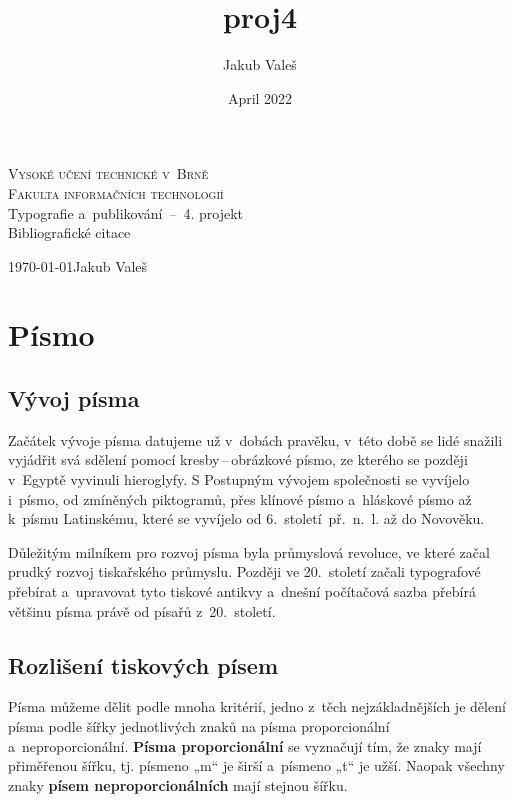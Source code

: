 \documentclass[a4paper, 11pt]{article}
\title{proj4}
\author{Jakub Valeš}
\date{April 2022}
\begin{document}
    \begin{titlepage}
        \begin{center}
            \textsc
            {\Huge{Vysoké učení technické v~Brně}\\[0.4em]
            {\huge Fakulta informačních technologií}}\\
            {\LARGE Typografie a~publikování \,--\, 4. projekt}\\[0.5em]
            {\Huge Bibliografické citace}\\
        \end{center}
    {\Large \today \hfill Jakub Valeš}
    \end{titlepage}

\section{Písmo}
    \subsection{Vývoj písma}
        Začátek vývoje písma datujeme už v~dobách pravěku, v~této době se lidé snažili vyjádřit svá sdělení pomocí kresby\,--\,obrázkové písmo, ze kterého se později v~Egyptě vyvinuli hieroglyfy. S Postupným vývojem společnosti se vyvíjelo i~písmo, od zmíněných piktogramů, přes klínové písmo a~hláskové písmo až k~písmu Latinskému, které se vyvíjelo od 6.~století~př.~n.~l. až do Novověku.~\cite{Vaclavkova:HistorickyVyvojPisma}
        
        Důležitým milníkem pro rozvoj písma byla průmyslová revoluce, ve které začal prudký rozvoj tiskařského průmyslu. Později ve 20.~století začali typografové přebírat a~upravovat tyto tiskové antikvy a~dnešní počítačová sazba přebírá většinu písma právě od písařů z~20.~století.~\cite{Hanacek:JakPublikovatNaPocitaci}
        
    \subsection{Rozlišení tiskových písem}
        Písma můžeme dělit podle mnoha kritérií, jedno z~těch nejzákladnějších je dělení písma podle šířky jednotlivých znaků na písma proporcionální a~neproporcionální. \textbf{Písma proporcionální} se vyznačují tím, že znaky mají přiměřenou šířku, tj. písmeno „m“ je širší a~písmeno „t“ je užší. Naopak všechny znaky \textbf{písem neproporcionálních} mají stejnou šířku.~\cite{Cvingrafova}
        
\end{document}
